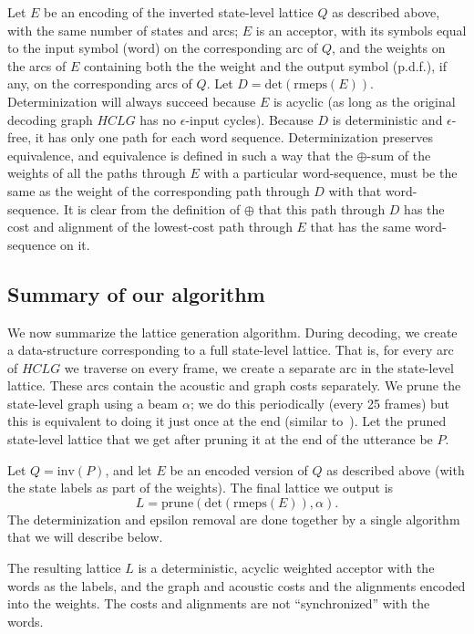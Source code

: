 \documentclass{article}
\def\HCLG{{\mathit{HCLG}}}
\def\inv{{\mathrm{inv}}}
\begin{document}
Let $E$ be an encoding of the inverted state-level lattice $Q$ 
as described above, with the same number of states and arcs; $E$ is an acceptor, with its symbols
equal to the input symbol (word) on the corresponding arc of $Q$, and
the weights on the arcs of $E$ containing both the the weight and the output symbol (p.d.f.),
if any, on the corresponding arcs of $Q$.  Let $D = \mathrm{det}(\mathrm{rmeps}(E))$.
Determinization
will always succeed because $E$ is acyclic (as long as the original decoding
graph $\HCLG$ has no $\epsilon$-input cycles).  Because $D$ is deterministic
and $\epsilon$-free, it has only one path for each word sequence. 
Determinization preserves equivalence,
and equivalence is defined in such a way that the $\oplus$-sum of the
weights of all the paths through $E$ with a particular word-sequence, must be the same
as the weight of the corresponding path through $D$ with that word-sequence.
It is clear from the definition of $\oplus$ that this path through
$D$ has the cost and alignment of the lowest-cost path through $E$ that has the
same word-sequence on it.  

\subsection{Summary of our algorithm}

We now summarize the lattice generation algorithm.  During decoding, we create a data-structure
corresponding to a full state-level lattice.  That is, for every arc of $\HCLG$ we traverse
on every frame, we create a separate arc in the state-level lattice.  These arcs
contain the acoustic and graph costs separately.  We prune the state-level graph using
a beam $\alpha$; we do this periodically (every 25 frames) but this is equivalent to
doing it just once at the end (similar to~\cite{efficient_general}).  Let the pruned
state-level lattice that we get after pruning it at the end of the utterance be $P$.

Let $Q = \inv(P)$, and let $E$ be an encoded version of $Q$ as described above (with the
state labels as part of the weights).  The final lattice we output is
\begin{equation}
   L = \mathrm{prune}(\mathrm{det}(\mathrm{rmeps}(E)), \alpha) .
\end{equation}
The determinization and epsilon removal are done together by a single algorithm
that we will describe below.

The resulting lattice $L$ is a deterministic, acyclic weighted acceptor with the 
words as the labels, and the graph and acoustic costs and the alignments
encoded into the weights.  The costs and alignments are not ``synchronized'' 
with the words.
\end{document}

